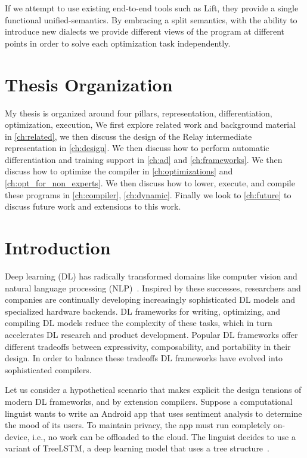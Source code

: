 If we attempt to use existing end-to-end tools such as Lift, they provide a single functional unified-semantics. By embracing a split semantics, with the ability to introduce new dialects we provide different views of the program at different points in order to solve each optimization task independently.


\section{Thesis Organization}

My thesis is organized around four pillars, representation, differentiation, optimization, execution,
We first explore related work and background material
  in \ref{ch:related}, we then discuss the design of the Relay intermediate representation in \ref{ch:design}.
We then discuss how to perform automatic differentiation and training support in \ref{ch:ad} and
  \ref{ch:frameworks}.
We then discuss how to optimize the compiler in \ref{ch:optimizations} and \ref{ch:opt_for_non_experts}.
We then discuss how to lower, execute, and compile these programs in
\ref{ch:compiler}, \ref{ch:dynamic}.
Finally we look to \ref{ch:future} to discuss future work and extensions to this work.


\section{Introduction}
\label{sec:intro}

Deep learning (DL) has radically transformed domains like
  computer vision and
  natural language processing (NLP)~\citep{yolo, recent_trends_in_nlp}.
Inspired by these successes,
  researchers and companies are continually
  developing increasingly sophisticated DL models and
  specialized hardware backends.
DL frameworks for writing, optimizing, and compiling DL models
  reduce the complexity of these tasks,
  which in turn accelerates DL research and product development.
Popular DL frameworks offer different tradeoffs between
  expressivity, composability, and portability in their design.
In order to balance these tradeoffs DL frameworks have
  evolved into sophisticated compilers.

Let us consider a hypothetical scenario that makes explicit
  the design tensions of modern DL frameworks, and by
  extension compilers.
Suppose a computational linguist wants to write
  an Android app that uses sentiment analysis to
  determine the mood of its users.
To maintain privacy, the app must run completely on-device,
  i.e., no work can be offloaded to the cloud.
The linguist decides to use a variant of TreeLSTM,
  a deep learning model that uses a tree structure~\citep{tree_lstm}.

